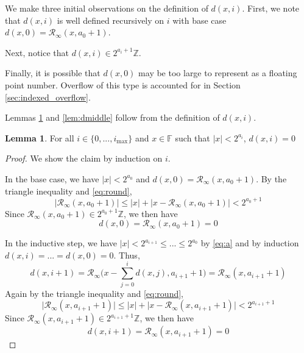 \documentclass[12pt]{article}
\providecommand{\F}{\ensuremath{\mathbb{F}}}
\providecommand{\Z}{\ensuremath{\mathbb{Z}}}
\providecommand{\max}{\ensuremath{\text{max}}}
\providecommand{\roundtonearestinfty}{\ensuremath{\mathcal{R}_\text{$\infty$}}}
\theoremstyle{definition}
\newtheorem{lem}[thm]{Lemma}
\numberwithin{equation}{section}
\numberwithin{figure}{section}
\begin{document}
    We make three initial observations on the definition of $d(x, i)$. First, we note that $d(x, i)$ is well defined recursively on $i$ with base case $d(x, 0) = \roundtonearestinfty(x, a_0 + 1)$.

    Next, notice that $d(x, i) \in 2^{a_{i} + 1}\Z$.

    Finally, it is possible that $d(x, 0)$ may be too large to represent as a floating point number. Overflow of this type is accounted for in Section \ref{sec:indexed_overflow}.

    Lemmas \ref{lem:dzero} and \ref{lem:dmiddle} follow from the definition of $d(x, i)$.

    \begin{samepage}
    \begin{lem}
      For all $i \in \{0, ..., i_{\max}\}$ and $x \in \F$ such that $|x| < 2^{a_i}$, $d(x, i) = 0$
      \label{lem:dzero}
    \end{lem}
    \end{samepage}

    \begin{proof}
      We show the claim by induction on $i$.

      In the base case, we have $|x| < 2^{a_0}$ and $d(x, 0) = \roundtonearestinfty(x, a_0 + 1)$. By the triangle inequality and  \eqref{eq:round},
      \begin{equation*}
        \bigl|\roundtonearestinfty(x, a_0 + 1)\bigr| \leq |x| + \bigl|x - \roundtonearestinfty(x, a_0 + 1)\bigr| < 2^{a_0 + 1}
      \end{equation*}
      Since $\roundtonearestinfty(x, a_0 + 1) \in 2^{a_0 + 1}\Z$, we then have
      \begin{equation*}
        d(x, 0) = \roundtonearestinfty(x, a_0 + 1) = 0
      \end{equation*}

      In the inductive step, we have $|x| < 2^{a_{i + 1}} \leq ... \leq 2^{a_0}$ by  \eqref{eq:a} and by induction $d(x, i)= ... = d(x, 0) = 0$. Thus,
      \begin{equation*}
        d(x, i + 1) = \roundtonearestinfty\bigl(x - \sum\limits_{j = 0}^{i}d(x, j), a_{i + 1} + 1\bigr) = \roundtonearestinfty(x, a_{i+1} + 1)
      \end{equation*}
      Again by the triangle inequality and  \eqref{eq:round},
      \begin{equation*}
        \bigl|\roundtonearestinfty(x, a_{i + 1} + 1)\bigr| \leq |x| + \bigl|x - \roundtonearestinfty(x, a_{i + 1} + 1)\bigr| < 2^{a_{i + 1} + 1}
      \end{equation*}
      Since $\roundtonearestinfty(x, a_{i + 1} + 1) \in 2^{a_{i + 1} + 1}\Z$, we then have
      \begin{equation*}
        d(x, i + 1) = \roundtonearestinfty(x, a_{i + 1} + 1) = 0
      \end{equation*}
    \end{proof}
\end{document}
